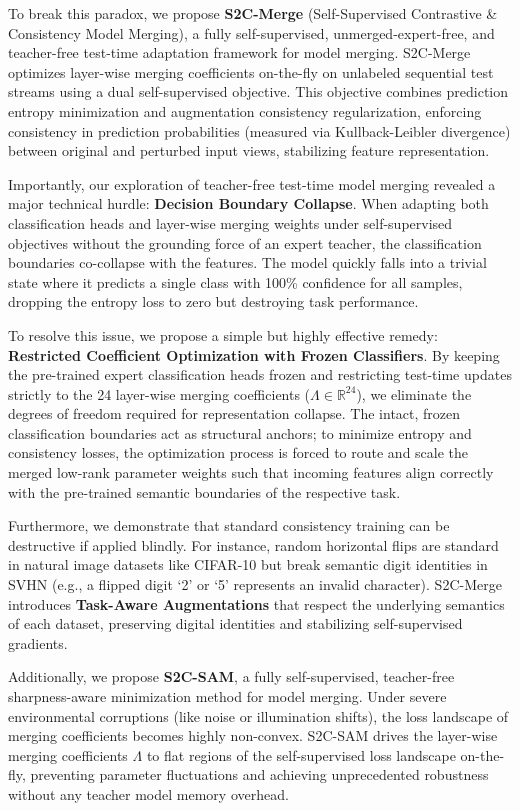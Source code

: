 \documentclass{article}
\theoremstyle{plain}
\theoremstyle{definition}
\theoremstyle{remark}
\begin{document}
To break this paradox, we propose \textbf{S2C-Merge} (Self-Supervised Contrastive \& Consistency Model Merging), a fully self-supervised, unmerged-expert-free, and teacher-free test-time adaptation framework for model merging. S2C-Merge optimizes layer-wise merging coefficients on-the-fly on unlabeled sequential test streams using a dual self-supervised objective. This objective combines prediction entropy minimization \cite{wang2021tent} and augmentation consistency regularization, enforcing consistency in prediction probabilities (measured via Kullback-Leibler divergence) between original and perturbed input views, stabilizing feature representation.

Importantly, our exploration of teacher-free test-time model merging revealed a major technical hurdle: \textbf{Decision Boundary Collapse}. When adapting both classification heads and layer-wise merging weights under self-supervised objectives without the grounding force of an expert teacher, the classification boundaries co-collapse with the features. The model quickly falls into a trivial state where it predicts a single class with 100\% confidence for all samples, dropping the entropy loss to zero but destroying task performance. 

To resolve this issue, we propose a simple but highly effective remedy: \textbf{Restricted Coefficient Optimization with Frozen Classifiers}. By keeping the pre-trained expert classification heads frozen and restricting test-time updates strictly to the 24 layer-wise merging coefficients ($\Lambda \in \mathbb{R}^{24}$), we eliminate the degrees of freedom required for representation collapse. The intact, frozen classification boundaries act as structural anchors; to minimize entropy and consistency losses, the optimization process is forced to route and scale the merged low-rank parameter weights such that incoming features align correctly with the pre-trained semantic boundaries of the respective task.

Furthermore, we demonstrate that standard consistency training can be destructive if applied blindly. For instance, random horizontal flips are standard in natural image datasets like CIFAR-10 but break semantic digit identities in SVHN (e.g., a flipped digit `2' or `5' represents an invalid character). S2C-Merge introduces \textbf{Task-Aware Augmentations} that respect the underlying semantics of each dataset, preserving digital identities and stabilizing self-supervised gradients.

Additionally, we propose \textbf{S2C-SAM}, a fully self-supervised, teacher-free sharpness-aware minimization method for model merging. Under severe environmental corruptions (like noise or illumination shifts), the loss landscape of merging coefficients becomes highly non-convex. S2C-SAM drives the layer-wise merging coefficients $\Lambda$ to flat regions of the self-supervised loss landscape on-the-fly, preventing parameter fluctuations and achieving unprecedented robustness without any teacher model memory overhead.
\end{document}
